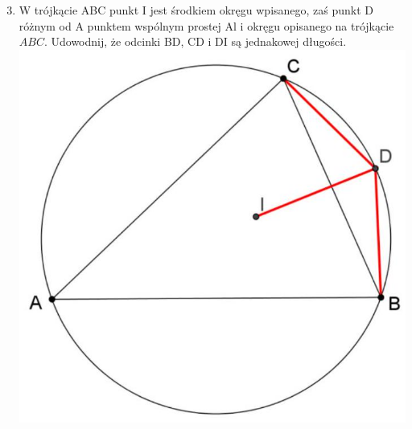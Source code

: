 \documentclass[10pt]{article}
\begin{document}
\begin{enumerate}
  \setcounter{enumi}{2}
  \item W trójkącie ABC punkt I jest środkiem okręgu wpisanego, zaś punkt D różnym od A punktem wspólnym prostej Al i okręgu opisanego na trójkącie \(A B C\). Udowodnij, że odcinki BD, CD i DI są jednakowej długości.\\
\includegraphics[max width=\textwidth, center]{2024_11_21_388519d38d11b6d14f67g-1(1)}
\end{enumerate}
\end{document}
